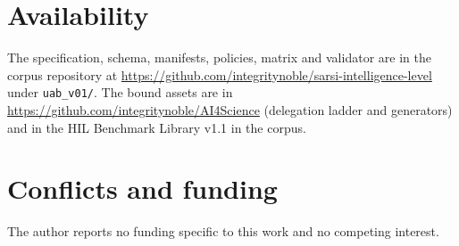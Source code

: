 \documentclass[11pt]{article}
\theoremstyle{definition}
\begin{document}
\section*{Availability}

The specification, schema, manifests, policies, matrix and validator are in the corpus repository at \url{https://github.com/integritynoble/sarsi-intelligence-level} under \texttt{uab\_v01/}. The bound assets are in \url{https://github.com/integritynoble/AI4Science} (delegation ladder and generators) and in the HIL Benchmark Library v1.1 in the corpus.

\section*{Conflicts and funding}

The author reports no funding specific to this work and no competing interest.



\end{document}
